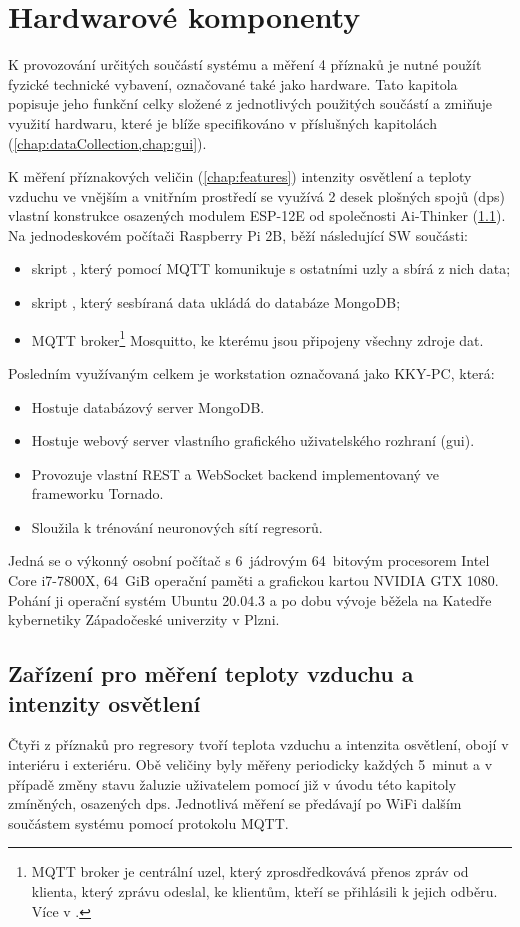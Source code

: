 \chapter{Hardwarové komponenty} \label{chap:hw}
K provozování určitých součástí systému a měření 4 příznaků je nutné použít fyzické technické vybavení, označované také jako hardware. Tato kapitola popisuje jeho funkční celky složené z jednotlivých použitých součástí a zmiňuje využití hardwaru, které je blíže specifikováno v příslušných kapitolách (\cref{chap:dataCollection,chap:gui}).

K měření příznakových veličin (\cref{chap:features}) intenzity osvětlení a teploty vzduchu ve vnějším a vnitřním prostředí se využívá 2 desek plošných spojů (\acrshort{dps}) vlastní konstrukce osazených modulem ESP-12E od společnosti Ai-Thinker (\cref{sec:senzory}). Na jednodeskovém počítači Raspberry Pi 2B, běží následující SW součásti:
\begin{itemize}
    \item skript , který pomocí MQTT komunikuje s ostatními uzly a sbírá z nich data;
    \item skript , který sesbíraná data ukládá do databáze MongoDB;
    \item MQTT broker\footnote{MQTT broker je centrální uzel, který zprosdředkovává přenos zpráv od klienta, který zprávu odeslal, ke klientům, kteří se přihlásili k jejich odběru. Více v .} Mosquitto, ke kterému jsou připojeny všechny zdroje dat.
\end{itemize}
\label{list:rpi}
Posledním využívaným celkem je workstation označovaná jako KKY-PC, která:
\begin{itemize}
    \item Hostuje databázový server MongoDB.
    \item Hostuje webový server vlastního grafického uživatelského rozhraní (\acrshort{gui}).
    \item Provozuje vlastní REST a WebSocket backend implementovaný ve frameworku Tornado.
    \item Sloužila k trénování neuronových sítí regresorů.
\end{itemize}
Jedná se o výkonný osobní počítač s 6~jádrovým 64~bitovým procesorem Intel Core i7-7800X, 64~GiB operační paměti a grafickou kartou NVIDIA GTX 1080. Pohání ji operační systém Ubuntu 20.04.3 a po dobu vývoje běžela na Katedře kybernetiky Západočeské univerzity v Plzni.

\section{Zařízení pro měření teploty vzduchu a intenzity osvětlení} \label{sec:senzory} %
    Čtyři z příznaků pro regresory tvoří teplota vzduchu a intenzita osvětlení, obojí v interiéru i exteriéru. Obě veličiny byly měřeny periodicky každých 5~minut a v případě změny stavu žaluzie uživatelem pomocí již v úvodu této kapitoly zmíněných, osazených \acrshort{dps}. Jednotlivá měření se předávají po WiFi dalším součástem systému pomocí protokolu MQTT.
    
